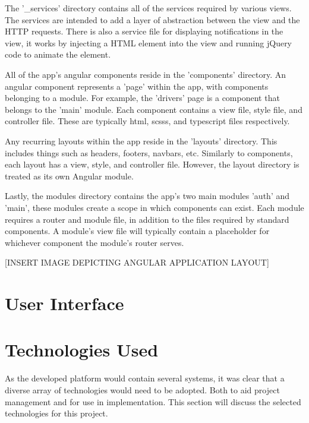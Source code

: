 The '\_services' directory contains all of the services required by various views. The services are intended to add a layer of abstraction between the view and the HTTP requests. There is also a service file for displaying notifications in the view, it works by injecting a HTML element into the view and running jQuery code to animate the element.

All of the app's angular components reside in the 'components' directory. An angular component represents a 'page' within the app, with components belonging to a module. For example, the 'drivers' page is a component that belongs to the 'main' module. Each component contains a view file, style file, and controller file. These are typically html, scsss, and typescript files respectively.

Any recurring layouts within the app reside in the 'layouts' directory. This includes things such as headers, footers, navbars, etc. Similarly to components, each layout has a view, style, and controller file. However, the layout directory is treated as its own Angular module.

Lastly, the modules directory contains the app's two main modules 'auth' and 'main', these modules create a scope in which components can exist. Each module requires a router and module file, in addition to the files required by standard components. A module's view file will typically contain a placeholder for whichever component the module's router serves.

[INSERT IMAGE DEPICTING ANGULAR APPLICATION LAYOUT]

\section{User Interface}

\section{Technologies Used}
As the developed platform would contain several systems, it was clear that a diverse array of technologies would need to be adopted. Both to aid project management and for use in implementation. This section will discuss the selected technologies for this project.

